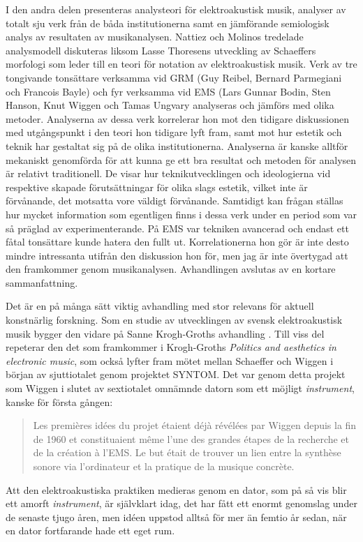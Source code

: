 \documentclass[11pt]{article}
\begin{document}
I den andra delen presenteras analysteori för elektroakustisk musik, analyser av totalt sju verk från de båda institutionerna samt en jämförande semiologisk analys av resultaten av musikanalysen. Nattiez och Molinos tredelade analysmodell diskuteras liksom Lasse Thoresens utveckling av Schaeffers morfologi som leder till en teori för notation av elektroakustisk musik. Verk av tre tongivande tonsättare verksamma vid GRM (Guy Reibel, Bernard Parmegiani och Francois Bayle) och fyr verksamma vid EMS (Lars Gunnar Bodin, Sten Hanson, Knut Wiggen och Tamas Ungvary analyseras och jämförs med olika metoder. Analyserna av dessa verk korrelerar hon mot den tidigare diskussionen med utgångspunkt i den teori hon tidigare lyft fram, samt mot hur estetik och teknik har gestaltat sig på de olika institutionerna. Analyserna är kanske alltför mekaniskt genomförda för att kunna ge ett bra resultat och metoden för analysen är relativt traditionell. De visar hur teknikutvecklingen och ideologierna vid respektive skapade förutsättningar för olika slags estetik, vilket inte är förvånande, det motsatta vore väldigt förvånande. Samtidigt kan frågan ställas hur mycket information som egentligen finns i dessa verk under en period som var så präglad av experimenterande. På EMS var tekniken avancerad och endast ett fåtal tonsättare kunde hatera den fullt ut. Korrelationerna hon gör är inte desto mindre intressanta utifrån den diskussion hon för, men jag är inte övertygad att den framkommer genom musikanalysen. Avhandlingen avslutas av en kortare sammanfattning.

Det är en på många sätt viktig avhandling med stor relevans för aktuell konstnärlig forskning. Som en studie av utvecklingen av svensk elektroakustisk musik bygger den vidare på Sanne Krogh-Groths avhandling \citet{groth2016}. Till viss del repeterar den det som framkommer i Krogh-Groths \emph{Politics and aesthetics in electronic music}, som också lyfter fram mötet mellan Schaeffer och Wiggen i början av sjuttiotalet genom projektet SYNTOM. Det var genom detta projekt som Wiggen i slutet av sextiotalet omnämnde datorn som ett möjligt \emph{instrument}, kanske för första gången:

\begin{quote}
Les premières idées du projet étaient déjà révélées par Wiggen depuis
la fin de 1960 et constituaient même l’une des grandes étapes de la
recherche et de la création à l’EMS. Le but était de trouver un lien
entre la synthèse sonore via l’ordinateur et la pratique de la musique
concrète.
\end{quote}
Att den elektroakustiska praktiken medieras genom en dator, som på så vis blir ett amorft \emph{instrument}, är självklart idag, det har fått ett enormt genomslag under de senaste tjugo åren, men idéen uppstod alltså för mer än femtio år sedan, när en dator fortfarande hade ett eget rum.
\end{document}

